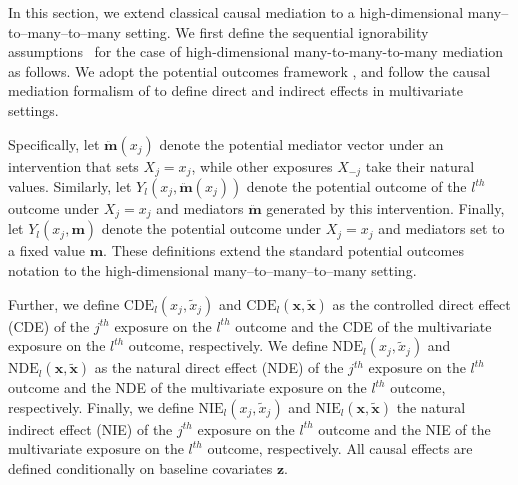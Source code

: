 \documentclass[
  12pt]{article}
\def\M{\mathbf{m}}
\def\m{\mathbf{m}}
\def\Z{\mathbf{z}}
\begin{document}
\bigskip

In this section, we extend classical causal mediation to a high-dimensional many--to--many--to--many setting. We first define the sequential ignorability assumptions~\citep{Robins-Richardson:2010} for the case of high-dimensional many-to-many-to-many mediation as follows. We adopt the potential outcomes framework \citep{Rubin:1974}, 
and follow the causal mediation formalism of \cite{imai2010identification,vanderweele2015explanation} 
to define direct and indirect effects in multivariate settings. 

Specifically, let $\ddot{\mathbf{m}}(x_j)$ denote the potential mediator vector under an intervention that sets $X_j = x_j$, while other exposures $X_{-j}$ take their natural values. Similarly, let $Y_l(x_j, \ddot{\mathbf{m}}(x_j))$ denote the potential outcome of the $l^{th}$ outcome 
under $X_j = x_j$ and mediators $\ddot{\mathbf{m}}$ generated by this intervention. Finally, let $Y_l(x_j, \m)$ denote the potential outcome under $X_j = x_j$ 
and mediators set to a fixed value $\m$. These definitions extend the standard potential outcomes notation to the high-dimensional many--to--many--to--many setting.   





Further, we define $\text{CDE}_l(x_j, \widetilde{x}_j)$ and $\text{CDE}_l(\mathbf{x}, \widetilde{\mathbf{x}})$ as the controlled direct effect (CDE) of the $j^{th}$ exposure on the $l^{th}$ outcome and the CDE of the multivariate exposure on the $l^{th}$ outcome, respectively. We define $\text{NDE}_l(x_j, \widetilde{x}_j)$ and $\text{NDE}_l(\mathbf{x}, \widetilde{\mathbf{x}})$ as the natural direct effect (NDE) of the $j^{th}$ exposure on the $l^{th}$ outcome and the NDE of the multivariate exposure on the $l^{th}$ outcome, respectively. Finally, we define $\text{NIE}_l(x_j, \widetilde{x}_j)$ and $\text{NIE}_l(\mathbf{x}, \widetilde{\mathbf{x}})$ the natural indirect effect (NIE) of the $j^{th}$ exposure on the $l^{th}$ outcome and the NIE of the multivariate exposure on the $l^{th}$ outcome, respectively. All causal effects are defined conditionally on baseline covariates $\Z$.
\end{document}
